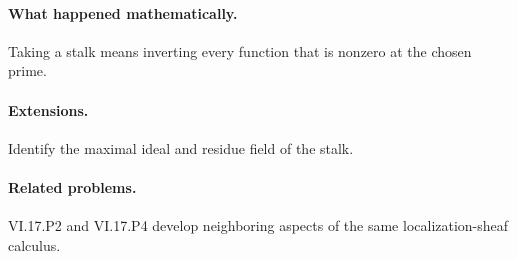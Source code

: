 \paragraph{What happened mathematically.}
Taking a stalk means inverting every function that is nonzero at the chosen prime.

\paragraph{Extensions.}
Identify the maximal ideal and residue field of the stalk.

\paragraph{Related problems.}
VI.17.P2 and VI.17.P4 develop neighboring aspects of the same localization-sheaf calculus.
\fi
